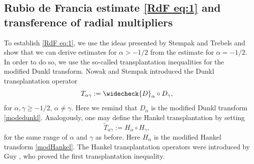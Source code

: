 \documentclass[11pt,oneside]{amsart}
\numberwithin{equation}{section}
\theoremstyle{definition}
\begin{document}
\subsection{Rubio de Francia estimate \eqref{RdF eq:1} and transference of radial multipliers}
To establish \eqref{RdF eq:1}, we use the ideas presented by Stempak and Trebels \cite{StempakTrebels1997} and show that we can derive estimates for $\alpha > -1/2$ from the estimate for $\alpha = -1/2$. In order to do so, we use the so-called transplantation inequalities for the modified Dunkl transform. Nowak and Stempak \cite{NowakStempak} introduced the Dunkl transplantation operator
\begin{equation*}
    T_{\alpha\gamma}:=\widecheck{D}_\alpha\circ D_\gamma,
\end{equation*}
for $\alpha,\gamma\geq-1/2$, $\alpha\neq\gamma$. Here we remind that $D_\alpha$ is the modified Dunkl transform \eqref{modedunkl}. Analogously, one may define the Hankel transplantation by setting
\begin{equation*}
    \widetilde{T}_{\alpha\gamma}:=H_\alpha\circ H_\gamma,
\end{equation*}
for the same range of $\alpha$ and $\gamma$ as before. Here $H_\alpha$ is the modified Hankel transform \eqref{modHankel}. The Hankel transplantation operators were introduced by Guy \cite{Guy}, who proved the first transplantation inequality.
\end{document}
